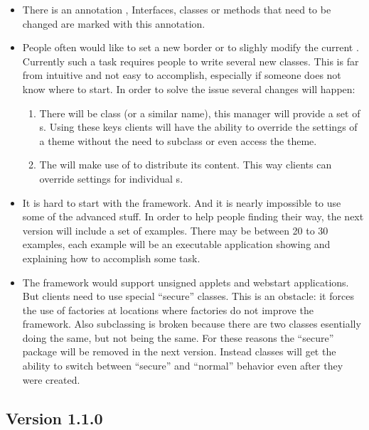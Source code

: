 \begin{itemize}
 \item There is an annotation , Interfaces, classes or methods that need to be changed are marked with this annotation.
 \item People often would like to set a new border or to slighly modify the current . Currently such a task requires people to write several new classes. This is far from intuitive and not easy to accomplish, especially if someone does not know where to start. In order to solve the issue several changes will happen:
 \begin{enumerate}
  \item There will be class  (or a similar name), this manager will provide a set of s. Using these keys clients will have the ability to override the settings of a theme without the need to subclass or even access the theme.
  \item The  will  make use of  to distribute its content. This way clients can override settings for individual s.
 \end{enumerate}
 \item It is hard to start with the framework. And it is nearly impossible to use some of the advanced stuff. In order to help people finding their way, the next version will include a set of examples. There may be between 20 to 30 examples, each example will be an executable application showing and explaining how to accomplish some task.
 \item The framework would support unsigned applets and webstart applications. But clients need to use special ``secure'' classes. This is an obstacle: it forces the use of factories at locations where factories do not improve the framework. Also subclassing is broken because there are two classes esentially doing the same, but not being the same. For these reasons the ``secure'' package will be removed in the next version. Instead classes will get the ability to switch between ``secure'' and ``normal'' behavior even after they were created.
\end{itemize}


\subsection{Version 1.1.0}
